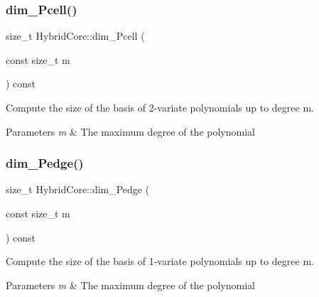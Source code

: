 \subsubsection{\texorpdfstring{dim\+\_\+\+Pcell()}{dim\_Pcell()}}
{\footnotesize\ttfamily size\+\_\+t Hybrid\+Core\+::dim\+\_\+\+Pcell (\begin{DoxyParamCaption}\item[{const size\+\_\+t}]{m }\end{DoxyParamCaption}) const}



Compute the size of the basis of 2-\/variate polynomials up to degree m. 


\begin{DoxyParams}{Parameters}
{\em m} & The maximum degree of the polynomial \\
\hline
\end{DoxyParams}
\mbox{\label{classHArDCore2D_1_1HybridCore_ab0fb57313f27fb8b4a6e9747de1d5cfe}} 
\subsubsection{\texorpdfstring{dim\+\_\+\+Pedge()}{dim\_Pedge()}}
{\footnotesize\ttfamily size\+\_\+t Hybrid\+Core\+::dim\+\_\+\+Pedge (\begin{DoxyParamCaption}\item[{const size\+\_\+t}]{m }\end{DoxyParamCaption}) const}



Compute the size of the basis of 1-\/variate polynomials up to degree m. 


\begin{DoxyParams}{Parameters}
{\em m} & The maximum degree of the polynomial \\
\hline
\end{DoxyParams}
\mbox{\label{classHArDCore2D_1_1HybridCore_a6b4feaeef7739a2e30fcf6c601fcf721}} 
